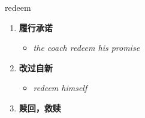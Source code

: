 
\begin{frame}
{\huge redeem}
\begin{center}
\begin{enumerate}\Large
  \item \textbf{履行承诺}
  \begin{itemize}
    \item \em{\Large{the coach redeem his promise}}
  \end{itemize}
  \item \textbf{改过自新}
  \begin{itemize}
    \item \em{\Large{redeem himself}}
  \end{itemize}
  \item \textbf{赎回，救赎}
\end{enumerate}
\end{center}
\end{frame}

